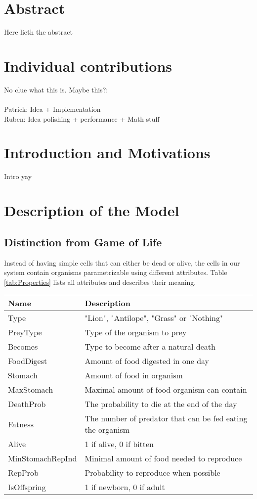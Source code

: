 \documentclass[11pt]{article}
\begin{document}
\section{Abstract}
Here lieth the abstract

\section{Individual contributions}
No clue what this is.
Maybe this?:\\ \\
Patrick: Idea + Implementation\\
Ruben: Idea polishing + performance + Math stuff

\section{Introduction and Motivations}
Intro yay

\section{Description of the Model}

\subsection{Distinction from Game of Life}
Instead of having simple cells that can either be dead or alive, the cells in our system contain organisms parametrizable using different attributes. Table \ref{tab:Properties} lists all attributes and describes their meaning.

\begin{tabular}{l|l}\label{tab:Properties}
Name & Description\\
\hline 
\hline 
Type & "Lion", "Antilope", "Grass" or "Nothing" \\ 
\hline 
PreyType & Type of the organism to prey \\ 
\hline 
Becomes & Type to become after a natural death \\ 
\hline 
FoodDigest & Amount of food digested in one day \\ 
\hline 
Stomach & Amount of food in organism \\ 
\hline 
MaxStomach & Maximal amount of food organism can contain \\ 
\hline 
DeathProb & The probability to die at the end of the day \\ 
\hline 
Fatness & The number of predator that can be fed eating the organism \\ 
\hline
Alive & 1 if alive, 0 if bitten\\
\hline 
MinStomachRepInd & Minimal amount of food needed to reproduce \\  
\hline 
RepProb & Probability to reproduce when possible\\
\hline 
IsOffspring & 1 if newborn, 0 if adult\\
\end{tabular}
\end{document}

